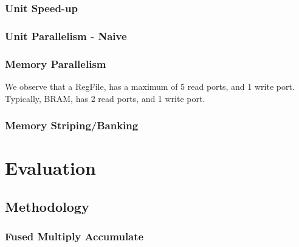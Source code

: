 \documentclass[a4paper,9pt]{report}
\begin{document}



\subsection{Unit Speed-up}
\subsection{Unit Parallelism - Naive}

\subsection{Memory Parallelism}

We observe that a RegFile, has a maximum of 5 read ports, and 1 write port.
Typically, BRAM, has 2 read ports, and 1 write port.


\subsection{Memory Striping/Banking}


\chapter{Evaluation} 
\section{Methodology}

\subsection{Fused Multiply Accumulate}
\end{document}
